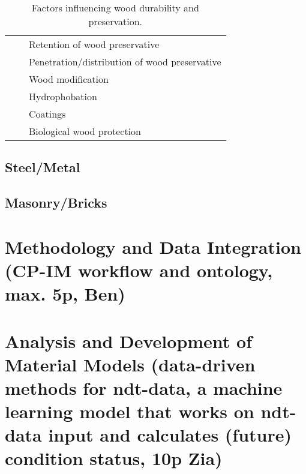 \begin{table}[ht!]
\begin{tabularx}{\textwidth}{|X|X|X|}
 &  & \hspace{5mm}Retention of wood preservative \\
 &  & \hspace{5mm}Penetration/distribution of wood preservative \\
 &  & \hspace{5mm}Wood modification \\
 &  & \hspace{5mm}Hydrophobation \\
 &  & \hspace{5mm}Coatings \\
 &  & \hspace{5mm}Biological wood protection \\
\hline
\end{tabularx}
\caption{Factors influencing wood durability and preservation.}
\label{table:factors}
\end{table}
\subsection{Steel/Metal}
\subsection{Masonry/Bricks}


\section{Methodology and Data Integration (CP-IM workflow and ontology, max. 5p, Ben)}



\section{Analysis and Development of Material Models (data-driven methods for ndt-data, a machine learning model that works on ndt-data input and calculates (future) condition status, 10p Zia)}

